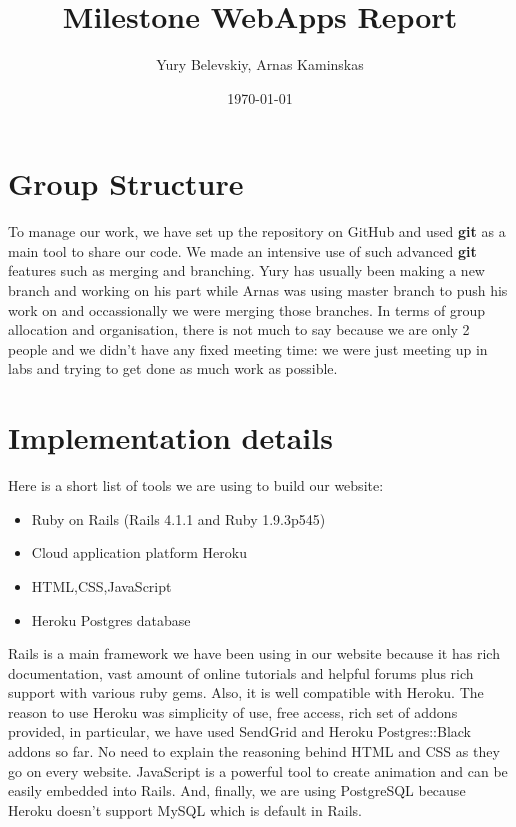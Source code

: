 \documentclass[12pt]{article}
\title{Milestone WebApps Report}
\author{Yury Belevskiy, Arnas Kaminskas}
\date{\today}
\begin{document}
\maketitle

\section*{Group Structure}
To manage our work, we have set up the repository on GitHub and used {\bf git} as a main tool to share our code. We made an intensive use of such advanced {\bf git} features such as merging and branching. Yury has usually been making a new branch and working on his part while Arnas was using master branch to push his work on and occassionally we were merging those branches.
\newline
In terms of group allocation and organisation, there is not much to say because we are only 2 people and we didn't have any fixed meeting time: we were just meeting up in labs and trying to get done as much work as possible.
\section*{Implementation details}
Here is a short list of tools we are using to build our website:
\begin{itemize}
\item Ruby on Rails (Rails 4.1.1 and Ruby 1.9.3p545)
\item Cloud application platform Heroku
\item HTML,CSS,JavaScript 
\item Heroku Postgres database
\end{itemize}
Rails is a main framework we have been using in our website because it has rich documentation, vast amount of online tutorials and helpful forums plus rich support with various ruby gems. Also, it is well compatible with Heroku. The reason to use Heroku was simplicity of use, free access, rich set of addons provided, in particular, we have used SendGrid and Heroku Postgres::Black addons so far. No need to explain the reasoning behind HTML and CSS as they go on every website. JavaScript is a powerful tool to create animation and can be easily embedded into Rails. And, finally, we are using PostgreSQL because Heroku doesn't support MySQL which is default in Rails.
\end{document}
